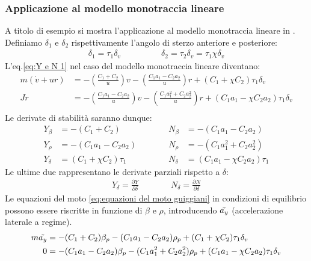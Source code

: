\subsubsection{Applicazione al modello monotraccia lineare}
A titolo di esempio si mostra l'applicazione al modello monotraccia lineare in \cite{guiggiani2007dinamica}.
Definiamo $\delta_1$ e $\delta_2$ rispettivamente l'angolo di sterzo anteriore e posteriore:\\
\begin{align}
     \delta_1 = \tau_1 \delta_v \qquad & \qquad \delta_2 = \tau_2 \delta_v = \tau_1 \chi \delta_v
\end{align}
L'eq.\ref{eq:Y e N 1} nel caso del modello monotraccia lineare diventano:
\begin{equation} \label{eq:equazioni del moto guiggiani}
  \begin{split}
     m(\dot{v} + ur) & = -(\frac{C_1 + C_2}{u})v - (\frac{C_1a_1-C_2a_2}{u})r + (C_1+\chi C_2)\tau_1 \delta_v \\
     J \dot{r} & = -(\frac{C_1a_1-C_2a_2}{u})v - (\frac{C_1a_1^2+C_2a_2^2}{u})r + (C_1a_1-\chi C_2a_2)\tau_1 \delta_v \\
  \end{split}
\end{equation}
Le derivate di stabilità saranno dunque:
\begin{align}
     Y_{\beta} & =-(C_1+C_2) \qquad \quad &  N_{\beta} & =-(C_1a_1-C_2a_2) \\
     Y_{\rho} & = -(C_1a_1-C_2a_2) \qquad \quad &  N_{\rho} & = -(C_1a_1^2+C_2a_2^2)\\
     Y_{\delta} & =(C_1+\chi C_2)\tau_1 \qquad \quad &  N_{\delta} & =(C_1a_1-\chi C_2a_2)\tau_1
\end{align}
Le ultime due rappresentano le derivate parziali rispetto a $\delta$:
  \begin{align}
     Y_{\delta}=\frac{\partial{Y}}{\partial{\delta}} \qquad \quad &  N_{\delta}=\frac{\partial{N}}{\partial{\delta}}
  \end{align}
Le equazioni del moto \ref{eq:equazioni del moto guiggiani} in condizioni di equilibrio possono essere riscritte in 
funzione di $\beta$ e $\rho$, introducendo $\Tilde{a_y}$ (accelerazione laterale a regime).\\
\begin{equation} \label{eq:equazioni del moto regime}
  \begin{split}
     m\Tilde{a_y} & = -(C_1+C_2)\beta_p - (C_1a_1-C_2a_2)\rho_p + (C_1+\chi C_2)\tau_1 \delta_v \\
     0 & = -(C_1a_1-C_2a_2)\beta_p - (C_1a_1^2+C_2a_2^2)\rho_p + (C_1a_1-\chi C_2a_2)\tau_1 \delta_v \\
  \end{split}
\end{equation}
